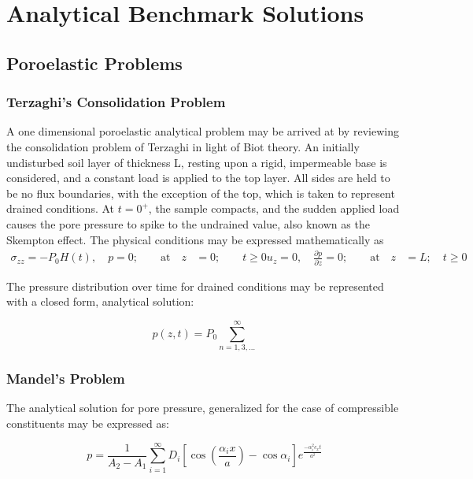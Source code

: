 
\chapter{\label{cha:Analytical-Solns}Analytical Benchmark Solutions}


\section{\label{sec:PoroelasticProblems}Poroelastic Problems}

\subsection{\label{sub:Terzaghi-Consolidation}Terzaghi's Consolidation Problem}

A one dimensional poroelastic analytical problem may be arrived at
by reviewing the consolidation problem of Terzaghi\cite{Terzaghi:1923} in light
of Biot theory. An initially undisturbed soil layer of thickness L, resting upon
a rigid, impermeable base is considered, and a constant load is applied to the top
layer. All sides are held to be no flux boundaries, with the exception of the top,
which is taken to represent drained conditions. At $t = 0^{+}$, the sample compacts,
and the sudden applied load causes the pore pressure to spike to the undrained 
value, also known as the Skempton effect. The physical conditions may be expressed 
mathematically as 
\begin{align}
 \sigma_{zz} = -P_{0}H(t), \quad p = 0; \qquad \text{at} \quad z &=0; \qquad t \geq 0
 u_{z} = 0, \quad \frac{\partial p}{\partial z} = 0; \qquad \text{at} \quad z &= L; \quad t \geq 0
\end{align}

The pressure distribution over time for drained conditions may be represented with a closed form, analytical
solution:

\begin{equation}
 p(z,t) = P_{0} \sum_{n = 1,3,\ldots}^{\infty}
\end{equation}



\subsection{Mandel's Problem}



The analytical solution for pore pressure, generalized for the case of compressible
constituents may be expressed as\cite{Cheng:Detourany:1988}:

\begin{equation}
 p = \frac{1}{A_{2} - A_{1}}   \sum_{i=1}^{\infty} D_{i} \left[ \cos \left( \frac{\alpha_{i}x}{a} \right) - \cos \alpha_{i} \right] e^{\frac{-\alpha_{i}^{2} c_{x} t}{a^{2}}} 
\end{equation}




